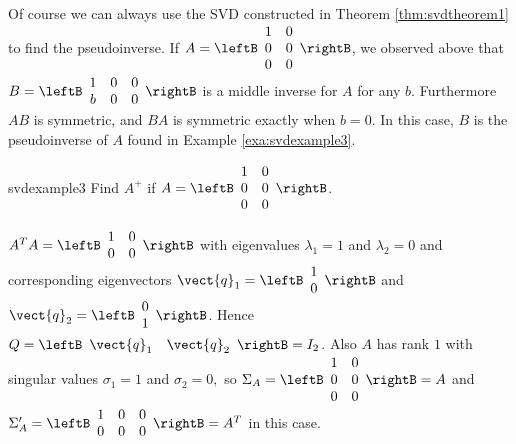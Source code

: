 Of course we can always use the SVD constructed in Theorem \ref{thm:svdtheorem1} to find the
pseudoinverse. If $A=
\leftB 
\begin{array}{cc}
1 & 0 \\ 
0 & 0 \\ 
0 & 0
\end{array}
\rightB$, we observed above that $B=
\leftB 
\begin{array}{ccc}
1 & 0 & 0 \\ 
b & 0 & 0
\end{array}
\rightB $ is a middle inverse for $A$ for any $b$. Furthermore $AB$ is
symmetric, and $BA$ is symmetric exactly when $b=0$. In this case, $B$ is the pseudoinverse of $A$ found in Example \ref{exa:svdexample3}.

\begin{example}{}{svdexample3} 
Find $A^{+}$ if $A=
\leftB 
\begin{array}{cc}
1 & 0 \\ 
0 & 0 \\ 
0 & 0
\end{array}
\rightB$.

\begin{solution} $A^{T}A=
\leftB 
\begin{array}{cc}
1 & 0 \\ 
0 & 0
\end{array}
\rightB $ with eigenvalues $\lambda_{1}=1$ and $\lambda_{2}=0$ and
corresponding eigenvectors $\vect{q}_{1}=
\leftB 
\begin{array}{c}
1 \\ 
0
\end{array}
\rightB $ and $\vect{q}_{2}=
\leftB 
\begin{array}{c}
0 \\ 
1
\end{array}
\rightB$. Hence $Q=\leftB \begin{array}{cc}\vect{q}_{1}&\vect{q}_{2}\end{array}\rightB=I_{2}$. Also $A$ has
rank $1$ with singular values $\sigma_{1}=1$ and $\sigma_{2}=0,$ so $\Sigma_{A}=
\leftB 
\begin{array}{cc}
1 & 0 \\ 
0 & 0 \\ 
0 & 0
\end{array}
\rightB=A$ and $\Sigma^{\prime}_{A}=
\leftB 
\begin{array}{ccc}
1 & 0 & 0 \\ 
0 & 0 & 0
\end{array}
\rightB=A^{T}$ in this case.


\end{solution}
\end{example}
